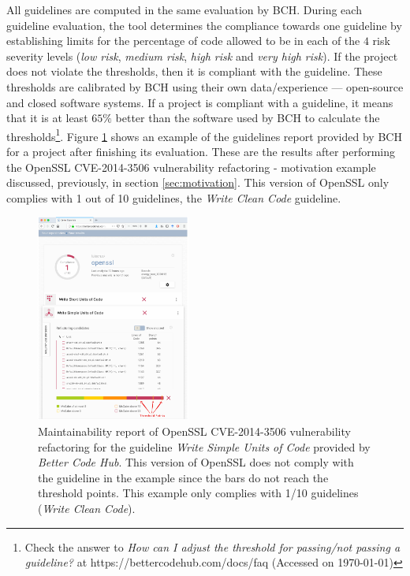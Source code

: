 \documentclass[10pt,conference]{IEEEtran}
\begin{document}
All guidelines are computed in the same evaluation by BCH. During each guideline
evaluation, the tool determines the compliance towards one guideline by
establishing limits for the percentage of code allowed to be in each of the $4$
risk severity levels (\emph{low risk}, \emph{medium risk}, \emph{high risk} and
\emph{very high risk}). If the project does not violate the thresholds, then it
is compliant with the guideline. These thresholds are calibrated by BCH using
their own data/experience --- open-source and closed software systems. If a
project is compliant with a guideline, it means that it is at least $65\%$
better than the software used by BCH to calculate the thresholds\footnote{Check
the answer to \emph{How can I adjust the threshold for passing/not passing a
guideline?} at https://bettercodehub.com/docs/faq (Accessed on \today{})}.
Figure \ref{fig:bchrep} shows an example of the  guidelines report
provided by BCH for a project after finishing its evaluation. These are the
results after performing the OpenSSL CVE-2014-3506 vulnerability refactoring -
motivation example discussed, previously, in section \ref{sec:motivation}. This
version of OpenSSL only complies with 1 out of 10 guidelines, the \emph{Write
Clean Code} guideline.

\begin{figure}[H]
 	\centering 	\includegraphics[width=0.45\textwidth]{figures/bch_report.png}
 	\caption{Maintainability report of OpenSSL CVE-2014-3506 vulnerability
refactoring for the guideline \emph{Write Simple Units of Code} provided by
\emph{Better Code Hub}. This version of OpenSSL does not comply with the
guideline in the example since the bars do not reach the threshold points. This
example only complies with 1/10 guidelines (\emph{Write Clean Code}).}
	\label{fig:bchrep}
\end{figure}
\end{document}
